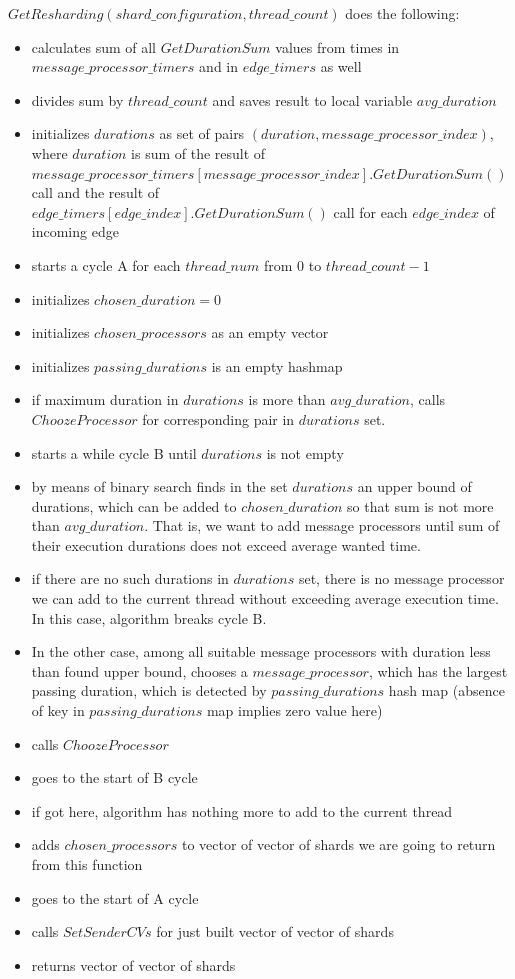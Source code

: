 \documentclass{article}
\begin{document}
$GetResharding(shard\_configuration, thread\_count)$ does the following:
\begin{itemize}
	\item calculates sum of all $GetDurationSum$ values from times in $message\_processor\_timers$ and in $edge\_timers$ as well
	\item divides sum by $thread\_count$ and saves result to local variable $avg\_duration$
	\item initializes $durations$ as set of pairs $(duration, message\_processor\_index)$,\\
		where $duration$ is sum of the result of \\
		$message\_processor\_timers[message\_processor\_index].GetDurationSum()$ call
		and the result of \\
		$edge\_timers[edge\_index].GetDurationSum()$ call for each $edge\_index$ of incoming edge
	\item starts a cycle A for each $thread\_num$ from 0 to $thread\_count - 1$
	\item initializes $chosen\_duration = 0$
	\item initializes $chosen\_processors$ as an empty vector
	\item initializes $passing\_durations$ is an empty hashmap
	\item if maximum duration in $durations$ is more than $avg\_duration$, calls $ChoozeProcessor$ for corresponding pair in $durations$ set.
	\item starts a while cycle B until $durations$ is not empty
	\item by means of binary search finds in the set $durations$ an upper bound of durations, which can be added to $chosen\_duration$ so that sum is not more than $avg\_duration$. That is, we want to add message processors until sum of their execution durations does not exceed average wanted time.
	\item if there are no such durations in $durations$ set, there is no message processor we can add to the current thread without exceeding average execution time. In this case, algorithm breaks cycle B.
	\item In the other case, among all suitable message processors with duration less than found upper bound, chooses a $message\_processor$, which has the largest passing duration, which is detected by $passing\_durations$ hash map (absence of key in $passing\_durations$ map implies zero value here)
	\item calls $ChoozeProcessor$
	\item goes to the start of B cycle
	\item if got here, algorithm has nothing more to add to the current thread
	\item adds $chosen\_processors$ to vector of vector of shards we are going to return from this function
	\item goes to the start of A cycle
	\item calls $SetSenderCVs$ for just built vector of vector of shards
	\item returns vector of vector of shards
\end{itemize}
\end{document}
